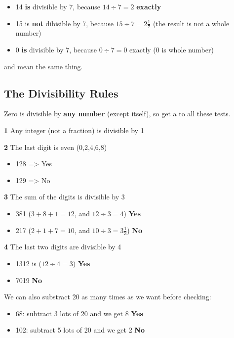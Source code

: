 \begin{itemize}
  \item 14 \textbf{is} divisible by 7, because $14 \div 7 = 2$ \textbf{exactly}
  \item 15 is \textbf{not} dibisible by 7, because $15 \div 7 = 2\frac{1}{7}$ (the result is not a whole number)
  \item 0 \textbf{is} divisible by 7, because $0 \div 7 = 0$ exactly (0 is  whole number)
\end{itemize}

 and  mean the same thing.

\subsection{The Divisibility Rules}

Zero is divisible by \textbf{any number} (except itself), so get a  to all these tests.

\textbf{1} Any integer (not a fraction) is divisible by 1

\textbf{2} The last digit is even (0,2,4,6,8)

\begin{itemize}
  \item 128 => Yes
  \item 129 => No
\end{itemize}

\textbf{3} The sum of the digits is divisible by 3

\begin{itemize}
  \item 381 ($3+8+1=12$, and $12 \div 3 = 4$) \textbf{Yes}
  \item 217 ($2+1+7=10$, and $10 \div 3 = 3\frac{1}{3}$) \textbf{No}
\end{itemize}

\vspace{10 mm}

\textbf{4} The last two digits are divisible by 4

\begin{itemize}
  \item 1312 is ($12 \div 4 = 3$) \textbf{Yes}
  \item 7019 \textbf{No}
\end{itemize}

We can also substract 20 as many times as we want before checking:

\begin{itemize}
  \item 68: subtract 3 lots of 20 and we get 8 \textbf{Yes}
  \item 102: subtract 5 lots of 20 and we get 2 \textbf{No}
\end{itemize}

